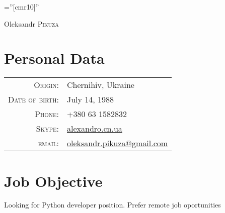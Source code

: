 \documentclass[a4paper,10pt]{article}
\begin{document}
\pagestyle{empty} %

\font\fb=''[cmr10]'' %

\par{\centering
  {\Huge Oleksandr \textsc{Pikuza}
}\bigskip\par}

\section{Personal Data}

\begin{tabular}{rl}
    \textsc{Origin:}   	& Chernihiv, Ukraine \\
    \textsc{Date of birth:}    & July 14, 1988 \\
    \textsc{Phone:}     & +380 63 1582832 \\
    \textsc{Skype:}	& \href{skype:alexandro.cn.ua}{alexandro.cn.ua} \\
    \textsc{email:}     & \href{mailto:oleksandr.pikuza@gmail.com}{oleksandr.pikuza@gmail.com} \\
\end{tabular}

\section{Job Objective}
Looking for Python developer position. Prefer remote job oportunities


\end{document}
